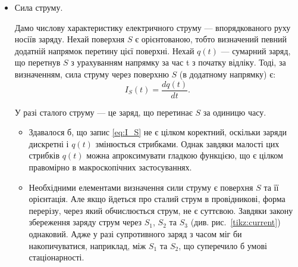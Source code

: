 \begin{itemize}

\item Сила струму.


Дамо числову характеристику електричного струму --- впорядкованого руху носіїв заряду.
Нехай поверхня $S$ є орієнтованою, тобто визначений певний додатній
напрямок перетину цієї поверхні. Нехай $q(t)$ --- сумарний заряд, що перетнув $S$ з
урахуванням напрямку за час t з початку відліку. Тоді, за визначенням, сила
струму через поверхню $S$ (в додатному напрямку) є:
\begin{equation}\label{eq:I_S}
    I_S(t) = \frac{dq(t)}{dt}.
\end{equation}

У разі сталого струму --- це заряд, що перетинає $S$ за одиницю часу.


\begin{itemize}
\item  Здавалося б, що запис \eqref{eq:I_S} не є цілком коректний, оскільки заряди дискретні і $q(t)$ змінюється стрибками. Однак завдяки малості цих
стрибків $q(t)$ можна апроксимувати гладкою функцією, що є цілком правомірно в макроскопічних застосуваннях.
\item  Необхідними елементами визначення сили струму є поверхня $S$ та її орієнтація. Але якщо йдеться про сталий струм в провідникові, форма перерізу,
через який обчислюється струм, не є суттєвою. Завдяки закону збереження заряду струм через $S_1$, $S_2$ та $S_3$ (див. рис.~\ref{tikz:current})
однаковий. Адже у
разі супротивного заряд з часом міг би накопичуватися, наприклад, між $S_1$ та $S_2$, що суперечило б умові стаціонарності.
\end{itemize}

\begin{SCfigure}[1][h!]
    \centering
\caption{}
\label{tikz:current}
\end{SCfigure}



\end{itemize}
